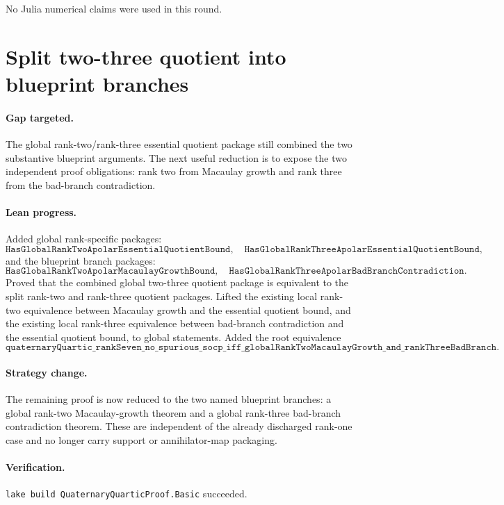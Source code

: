 \documentclass[11pt]{article}
\begin{document}
No Julia numerical claims were used in this round.

\section*{Split two-three quotient into blueprint branches}

\paragraph{Gap targeted.}
The global rank-two/rank-three essential quotient package still combined the
two substantive blueprint arguments.  The next useful reduction is to expose
the two independent proof obligations: rank two from Macaulay growth and rank
three from the bad-branch contradiction.

\paragraph{Lean progress.}
Added global rank-specific packages:
\[
\texttt{HasGlobalRankTwoApolarEssentialQuotientBound},
\quad
\texttt{HasGlobalRankThreeApolarEssentialQuotientBound},
\]
and the blueprint branch packages:
\[
\texttt{HasGlobalRankTwoApolarMacaulayGrowthBound},
\quad
\texttt{HasGlobalRankThreeApolarBadBranchContradiction}.
\]
Proved that the combined global two-three quotient package is equivalent to
the split rank-two and rank-three quotient packages.  Lifted the existing local
rank-two equivalence between Macaulay growth and the essential quotient bound,
and the existing local rank-three equivalence between bad-branch contradiction
and the essential quotient bound, to global statements.  Added the root
equivalence
\[
\texttt{quaternaryQuartic\_rankSeven\_no\_spurious\_socp\_iff\_globalRankTwoMacaulayGrowth\_and\_rankThreeBadBranch}.
\]

\paragraph{Strategy change.}
The remaining proof is now reduced to the two named blueprint branches: a
global rank-two Macaulay-growth theorem and a global rank-three bad-branch
contradiction theorem.  These are independent of the already discharged
rank-one case and no longer carry support or annihilator-map packaging.

\paragraph{Verification.}
\texttt{lake build QuaternaryQuarticProof.Basic} succeeded.
\end{document}
